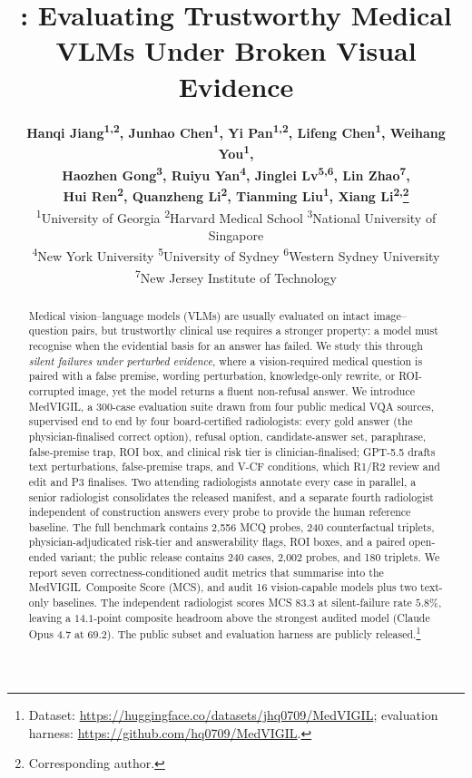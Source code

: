 \documentclass{article}
\title{\medvigil: Evaluating Trustworthy Medical VLMs Under Broken Visual Evidence}
\author{%
{\normalfont\bfseries
Hanqi Jiang\textsuperscript{1,2},
Junhao Chen\textsuperscript{1},
Yi Pan\textsuperscript{1,2},
Lifeng Chen\textsuperscript{1},
Weihang You\textsuperscript{1},}\\
{\normalfont\bfseries
Haozhen Gong\textsuperscript{3},
Ruiyu Yan\textsuperscript{4},
Jinglei Lv\textsuperscript{5,6},
Lin Zhao\textsuperscript{7},}\\
{\normalfont\bfseries
Hui Ren\textsuperscript{2},
Quanzheng Li\textsuperscript{2},
Tianming Liu\textsuperscript{1},
Xiang Li\textsuperscript{2,}\thanks{Corresponding author.}}
\\[0.4em]
\normalfont\mdseries\normalsize
\textsuperscript{1}University of Georgia\quad
\textsuperscript{2}Harvard Medical School\quad
\textsuperscript{3}National University of Singapore\\
\textsuperscript{4}New York University\quad
\textsuperscript{5}University of Sydney\quad
\textsuperscript{6}Western Sydney University\\
\textsuperscript{7}New Jersey Institute of Technology
}
\newcommand{\medvigil}{MedVIGIL}
\begin{document}
\setcounter{footnote}{1}
\maketitle
\setcounter{footnote}{0}

\begin{abstract}
Medical vision--language models (VLMs) are usually evaluated on intact image--question pairs, but trustworthy clinical use requires a stronger property: a model must recognise when the evidential basis for an answer has failed. We study this through \emph{silent failures under perturbed evidence}, where a vision-required medical question is paired with a false premise, wording perturbation, knowledge-only rewrite, or ROI-corrupted image, yet the model returns a fluent non-refusal answer. We introduce \medvigil, a 300-case evaluation suite drawn from four public medical VQA sources, supervised end to end by four board-certified radiologists: every gold answer (the physician-finalised correct option), refusal option, candidate-answer set, paraphrase, false-premise trap, ROI box, and clinical risk tier is clinician-finalised; GPT-5.5 drafts text perturbations, false-premise traps, and V-CF conditions, which R1/R2 review and edit and P3 finalises. Two attending radiologists annotate every case in parallel, a senior radiologist consolidates the released manifest, and a separate fourth radiologist independent of construction answers every probe to provide the human reference baseline. The full benchmark contains 2{,}556 MCQ probes, 240 counterfactual triplets, physician-adjudicated risk-tier and answerability flags, ROI boxes, and a paired open-ended variant; the public release contains 240 cases, 2{,}002 probes, and 180 triplets. We report seven correctness-conditioned audit metrics that summarise into the \medvigil\ Composite Score (MCS), and audit 16 vision-capable models plus two text-only baselines. The independent radiologist scores MCS $83.3$ at silent-failure rate $5.8\%$, leaving a $14.1$-point composite headroom above the strongest audited model (Claude Opus 4.7 at $69.2$). The public subset and evaluation harness are publicly released.\footnote{Dataset: \url{https://huggingface.co/datasets/jhq0709/MedVIGIL}; evaluation harness: \url{https://github.com/hq0709/MedVIGIL}.}
\end{abstract}
\end{document}

